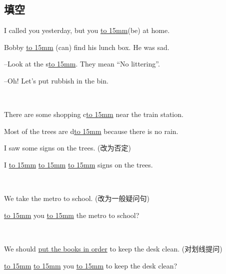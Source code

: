 \subsection{填空}
\item{
    I called you yesterday, but you \underline{\hbox to 15mm{}}(be) at home.
}
\\
\item{
    Bobby \underline{\hbox to 15mm{}} (can) find his lunch box. He was sad.
}
\\
\item{
    --Look at the s\underline{\hbox to 15mm{}}. They mean ``No littering''. 

    --Oh! Let's put rubbish in the bin.
}
\\
\item{
    There are some shopping c\underline{\hbox to 15mm{}} near the train station.
}
\\
\item{
    Most of the trees are d\underline{\hbox to 15mm{}} because there is no rain.
}
\\
\item{
    I saw some signs on the trees. (改为否定)
    
    I \underline{\hbox to 15mm{}} \underline{\hbox to 15mm{}} \underline{\hbox to 15mm{}} signs on the trees.
}
\\
\item{
    We take the metro to school. (改为一般疑问句)
    
    \underline{\hbox to 15mm{}} you \underline{\hbox to 15mm{}} the metro to school?
}
\\
\item{
    We should \underline{put the books in order} to keep the desk clean. (对划线提问)
    
    \underline{\hbox to 15mm{}} \underline{\hbox to 15mm{}} you \underline{\hbox to 15mm{}} to keep the desk clean?
}
\\


